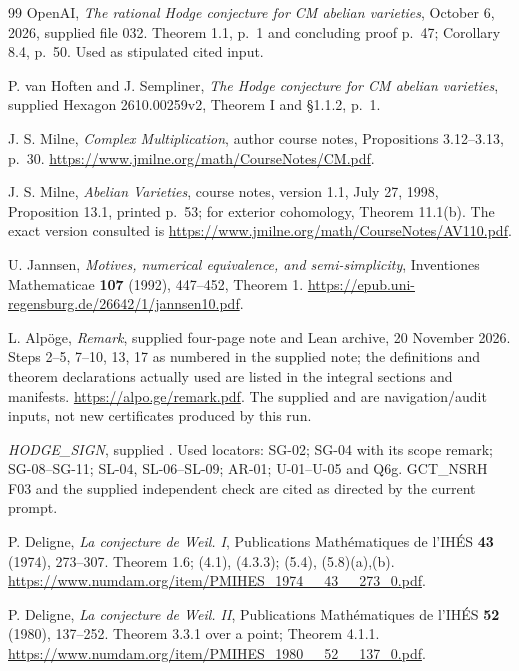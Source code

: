 \documentclass[11pt,a4paper]{article}
\theoremstyle{definition}
\theoremstyle{remark}
\begin{document}
\begin{thebibliography}{99}
OpenAI, \emph{The rational Hodge conjecture for CM abelian
varieties}, October 6, 2026, supplied file 032.
Theorem 1.1, p.~1 and concluding proof p.~47;
Corollary 8.4, p.~50. Used as stipulated cited input.

P. van Hoften and J. Sempliner,
\emph{The Hodge conjecture for CM abelian varieties},
supplied Hexagon 2610.00259v2, Theorem I and \S1.1.2, p.~1.

J. S. Milne, \emph{Complex Multiplication}, author course notes,
Propositions 3.12--3.13, p.~30.
\url{https://www.jmilne.org/math/CourseNotes/CM.pdf}.

J. S. Milne, \emph{Abelian Varieties}, course notes,
version 1.1, July 27, 1998, Proposition 13.1, printed p.~53;
for exterior cohomology, Theorem 11.1(b).
The exact version consulted is
\url{https://www.jmilne.org/math/CourseNotes/AV110.pdf}.

U. Jannsen, \emph{Motives, numerical equivalence, and
semi-simplicity}, Inventiones Mathematicae \textbf{107}
(1992), 447--452, Theorem 1.
\url{https://epub.uni-regensburg.de/26642/1/jannsen10.pdf}.

L. Alp\"oge, \emph{Remark}, supplied four-page note and Lean archive,
20 November 2026. Steps 2--5, 7--10, 13, 17 as numbered in the
supplied note; the definitions and theorem declarations actually
used are listed in the integral sections and manifests.
\url{https://alpo.ge/remark.pdf}.
The supplied  and
 are navigation/audit inputs,
not new certificates produced by this run.

\emph{HODGE\_SIGN}, supplied
.
Used locators: SG-02; SG-04 with its scope remark;
SG-08--SG-11; SL-04, SL-06--SL-09;
AR-01; U-01--U-05 and Q6g.
GCT\_NSRH F03 and the supplied independent check are cited
as directed by the current prompt.

P. Deligne, \emph{La conjecture de Weil. I},
Publications Math\'ematiques de l'IH\'ES \textbf{43}
(1974), 273--307.
Theorem 1.6; (4.1), (4.3.3); (5.4), (5.8)(a),(b).
\url{https://www.numdam.org/item/PMIHES_1974__43__273_0.pdf}.

P. Deligne, \emph{La conjecture de Weil. II},
Publications Math\'ematiques de l'IH\'ES \textbf{52}
(1980), 137--252.
Theorem 3.3.1 over a point; Theorem 4.1.1.
\url{https://www.numdam.org/item/PMIHES_1980__52__137_0.pdf}.


\end{thebibliography}
\end{document}
